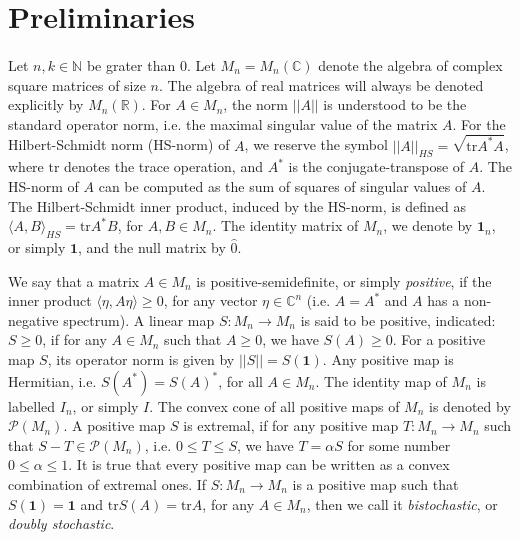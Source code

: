 \documentclass[12pt]{article}
\theoremstyle{plain}
\theoremstyle{definition}
\theoremstyle{remark}
\numberwithin{equation}{section}
\begin{document}

\section{Preliminaries}
\label{sec:Preliminaries}

\paragraph{}
Let $n, k \in \mathbb{N}$ be grater than 0.
Let $M_{n} = M_{n}(\mathbb{C})$ denote the algebra of complex square
matrices of size $n$.
The algebra of real matrices will always be denoted explicitly by
$M_{n}(\mathbb{R})$.
For $A \in M_{n}$, the norm $||A||$ is understood to be the standard operator
norm, i.e. the maximal singular value of the matrix $A$.
For the Hilbert-Schmidt norm (HS-norm) of $A$,
we reserve the symbol
$||A||_{HS} = \sqrt{\text{tr} A^{*} A}$,
where $\text{tr}$ denotes the trace operation,
and $A^{*}$ is the conjugate-transpose of $A$.
The HS-norm of $A$ can be computed as the sum of squares of
singular values of $A$.
The Hilbert-Schmidt inner product, induced by the HS-norm,
is defined as
$\langle A, B \rangle_{HS} = \text{tr} A^{*} B$,
for $A, B \in M_{n}$.
The identity matrix of $M_{n}$, we denote by $\mathbf{1}_{n}$,
or simply $\mathbf{1}$, and the null matrix by $\hat{0}$.

We say that a matrix $A \in M_{n}$ is positive-semidefinite,
or simply \emph{positive},
if the inner product $\langle \eta, A \eta \rangle \geq 0$,
for any vector $\eta \in \mathbb{C}^{n}$
(i.e. $A = A^{*}$ and $A$ has a non-negative spectrum).
A linear map $S\!: M_{n} \rightarrow M_{n}$ is said to be positive,
indicated: $S \geq 0$,
if for any $A \in M_{n}$ such that $A \geq 0$,
we have $S(A) \geq 0$. 
For a positive map $S$,
its operator norm is given by $||S|| = S(\mathbf{1})$.
Any positive map is Hermitian,
i.e.  $S(A^{*}) = S(A)^{*}$, for all $A \in M_{n}$.
The identity map of $M_{n}$ is labelled $I_{n}$,
or simply $I$.
The convex cone of all positive maps of $M_{n}$ is denoted
by $\mathcal{P}(M_{n})$.
A positive map $S$ is extremal,
if for any positive map $T: M_{n} \rightarrow M_{n}$ such that
$S - T \in \mathcal{P}(M_{n})$,
i.e. $0 \leq T \leq S$,
we have $T = \alpha S$ for some number $0 \leq \alpha \leq 1$.
It is true that every positive map
can be written as a convex combination of extremal ones.
If  $S\!: M_{n} \rightarrow M_{n}$ is a positive map such that
$S(\mathbf{1}) = \mathbf{1}$ and
$\text{tr} S(A) = \text{tr} A$,
for any $A \in M_{n}$,
then we call it \emph{bistochastic},
or \emph{doubly stochastic}.
\end{document}
